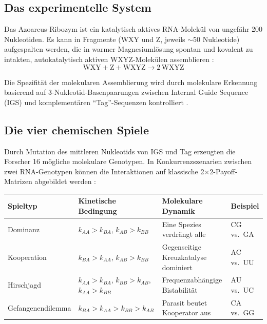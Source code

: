 \documentclass[12pt,a4paper]{article}
\theoremstyle{remark}
\begin{document}
\subsection{Das experimentelle System}

Das Azoarcus-Ribozym ist ein katalytisch aktives RNA-Molek\"ul von ungef\"ahr 200 Nukleotiden. Es kann in Fragmente (WXY und Z, jeweils $\sim$50 Nukleotide) aufgespalten werden, die in warmer Magnesiuml\"osung spontan und kovalent zu intakten, autokatalytisch aktiven WXYZ-Molek\"ulen assemblieren \citep{AzoarcusPMC}:
\begin{equation}
\text{WXY} + \text{Z} + \text{WXYZ} \longrightarrow 2\,\text{WXYZ}
\end{equation}

Die Spezifit\"at der molekularen Assemblierung wird durch molekulare Erkennung basierend auf 3-Nukleotid-Basenpaarungen zwischen Internal Guide Sequence (IGS) und komplement\"aren ``Tag''-Sequenzen kontrolliert \citep{AzoarcusPNAS}.

\subsection{Die vier chemischen Spiele}

Durch Mutation des mittleren Nukleotids von IGS und Tag erzeugten die Forscher 16 m\"ogliche molekulare Genotypen. In Konkurrenzszenarien zwischen zwei RNA-Genotypen k\"onnen die Interaktionen auf klassische 2$\times$2-Payoff-Matrizen abgebildet werden \citep{AzoarcusPMC}:

\begin{center}
\begin{tabular}{llll}
\toprule
\textbf{Spieltyp} & \textbf{Kinetische Bedingung} & \textbf{Molekulare Dynamik} & \textbf{Beispiel} \\
\midrule
Dominanz & $k_{AA} > k_{BA}$, $k_{AB} > k_{BB}$ & Eine Spezies verdrängt alle & CG vs.\ GA \\
Kooperation & $k_{BA} > k_{AA}$, $k_{AB} > k_{BB}$ & Gegenseitige Kreuzkatalyse dominiert & AC vs.\ UU \\
Hirschjagd & $k_{AA} > k_{BA}$, $k_{BB} > k_{AB}$, $k_{AA} > k_{BB}$ & Frequenzabh\"angige Bistabilit\"at & AU vs.\ UC \\
Gefangenendilemma & $k_{BA} > k_{AA} > k_{BB} > k_{AB}$ & Parasit beutet Kooperator aus & CA vs.\ GG \\
\bottomrule
\end{tabular}
\end{center}
\end{document}
